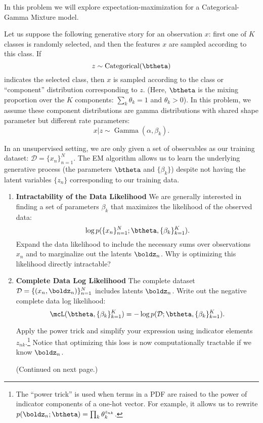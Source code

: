\documentclass[submit]{harvardml}
\begin{document}
\begin{problem}

In this problem we will explore expectation-maximization for a Categorical-Gamma Mixture model.

Let us suppose the following generative story for an observation $x$: first one of $K$ classes is randomly selected, and then the features $x$ are sampled according to this class. If $$z \sim \operatorname{Categorical}(\btheta)$$ indicates the selected class, then $x$ is sampled according to the class or ``component'' distribution corresponding to $z$. (Here, $\btheta$ is the mixing proportion over the $K$ components: $\sum_k \theta_k = 1$ and $ \theta_k > 0$). In this problem, we assume these component distributions are gamma distributions with shared shape parameter but different rate parameters: $$x | z \sim \operatorname{Gamma}(\alpha, \beta_k).$$

In an unsupervised setting, we are only given a set of observables as our training dataset: $\mathcal D = \{x_n\}_{n=1}^N$. The EM algorithm allows us to learn the underlying generative process (the parameters $\btheta$ and $\{\beta_k\}$) despite not having the latent variables $\{z_n\}$ corresponding to our training data.

\vspace{2em}

\begin{enumerate}

  \item \textbf{Intractability of the Data Likelihood} We are
    generally interested in finding a set of parameters $\beta_k$ that
    maximizes the likelihood of the observed data: $$\log
    p(\{x_n\}^N_{n=1}; \btheta, \{\beta_k\}^K_{k = 1}).$$ Expand the data
    likelihood to include the necessary sums over observations
    $x_n$ and to marginalize out the latents
    $\boldz_n$. Why is optimizing this likelihood directly
    intractable?

\item \textbf{Complete Data Log Likelihood} The complete dataset
  $\mathcal D = \{(x_n, \boldz_n)\}_{n=1}^N$ includes latents $\boldz_n$. Write
  out the negative complete data log likelihood: $$\mcL(\btheta, \{\beta_k\}^K_{k=1}) =  -\log p(\mathcal D; \btheta, \{\beta_k\}^K_{k=1}).$$

  Apply the power trick and simplify your expression using indicator elements $z_{n
  k}$.\footnote{The ``power trick'' is used when terms in a PDF are raised to the power of indicator components of a one-hot vector.  For example, it allows us to rewrite $p(\boldz_n ;  \btheta) = \prod_k \theta_k^{z_{nk}}$.} Notice that optimizing this loss is now computationally tractable if we know $\boldz_n$.

  (Continued on next page.)

\end{enumerate}

\end{problem}
\end{document}
